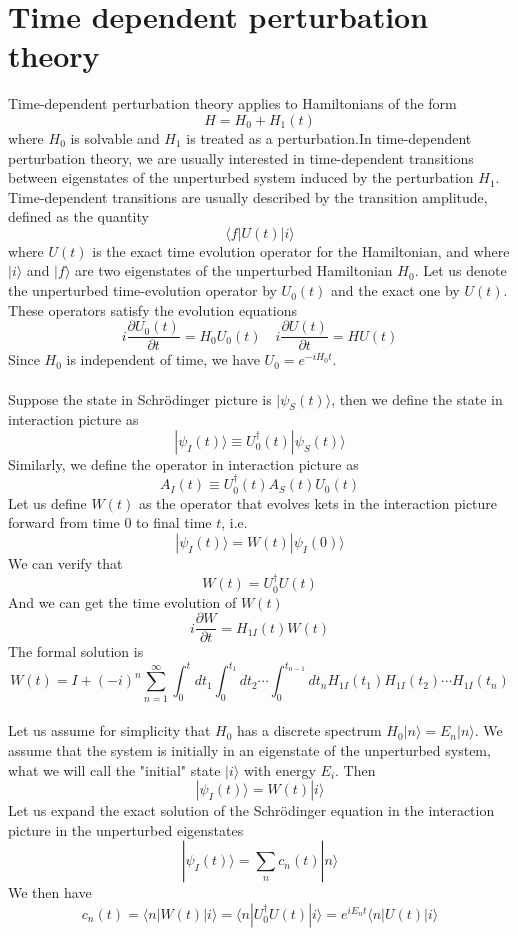 \section{Time dependent perturbation theory}
Time-dependent perturbation theory applies to Hamiltonians of the form
\[H = H_0 + H_1(t)\]
where $H_0$ is solvable and $H_1$ is treated as a perturbation.In time-dependent perturbation theory, we are usually interested in time-dependent transitions between eigenstates of the unperturbed system induced by the perturbation $H_1$.
Time-dependent transitions are usually described by the transition amplitude, defined as the quantity
\[\langle f | U(t) | i \rangle\]
where $U(t)$ is the exact time evolution operator for the Hamiltonian, and where $|i\rangle$ and $|f\rangle$ are
two eigenstates of the unperturbed Hamiltonian $H_0$. 
Let us denote the unperturbed time-evolution operator by $U_0(t)$ and the exact one by $U(t)$.
These operators satisfy the evolution equations
\[i\frac{\partial U_0(t)}{\partial t} = H_0U_0(t) \quad i\frac{\partial U(t)}{\partial t} = HU(t)\]
Since $H_0$ is independent of time, we have $U_0 = e^{-iH_0 t}$.\\ \\
Suppose the state in Schrödinger picture is $|\psi_S(t)\rangle$, then we define the state in interaction picture as
\[|\psi_I(t)\rangle \equiv U^{\dagger}_0(t) |\psi_S(t)\rangle\]
Similarly, we define the operator in interaction picture as
\[A_I(t) \equiv U^{\dagger}_0(t) A_S(t) U_0(t)\]
Let us define $W(t)$ as the operator that evolves kets in the interaction picture forward from time $0$ to final time $t$, i.e.
\[ |\psi_I(t)\rangle = W(t) |\psi_I(0)\rangle \]
We can verify that
\[W(t) = U^{\dagger}_0U(t)\]
And we can get the time evolution of $W(t)$
\[i\frac{\partial W}{\partial t} = H_{1I}(t)W(t)\]
The formal solution is
\[W(t) = I + (-i)^n \sum_{n=1}^{\infty} \int_{0}^{t}dt_1 \int_{0}^{t_1}dt_2 \cdots \int_{0}^{t_{n-1}} dt_n H_{1I}(t_1)H_{1I}(t_2)\cdots H_{1I}(t_n)\]\\
Let us assume for simplicity that $H_0$ has a discrete spectrum $H_0|n\rangle = E_n|n\rangle$. 
We assume that the system is initially in an eigenstate of the unperturbed system, what we will call the "initial" state $|i\rangle$ with energy $E_i$. Then 
\[|\psi_I(t)\rangle = W(t)|i\rangle\]
Let us expand the exact solution of the Schrödinger equation in the interaction picture in the unperturbed eigenstates
\[|\psi_I(t)\rangle = \sum_n c_n(t) |n\rangle\]
We then have
\[c_n(t) = \langle n | W(t) | i\rangle = \langle n | U^{\dagger}_0U(t) | i\rangle = e^{iE_nt} \langle n | U(t) | i\rangle \]
